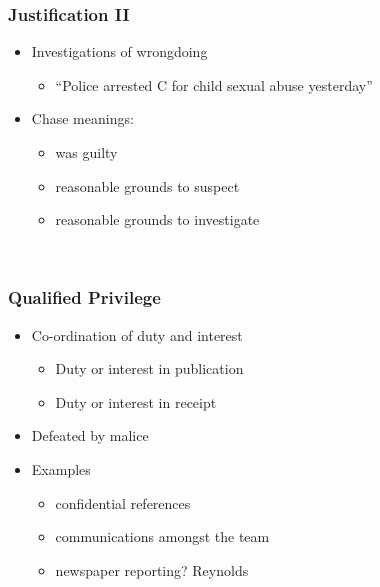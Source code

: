 \documentclass[ignorenonframetext,]{beamer}
\begin{document}
\begin{frame}
\frametitle{Justification II}

\begin{itemize}
\item  Investigations of wrongdoing

  \begin{itemize}
  \item    ``Police arrested C for child sexual abuse yesterday''
  \end{itemize}
\item  {Chase} meanings:

  \begin{itemize}
  \item    was guilty
  \item    reasonable grounds to suspect
  \item    reasonable grounds to investigate
  \end{itemize}
\end{itemize}

~


\end{frame}

\begin{frame}
\frametitle{Qualified Privilege}

\begin{itemize}
\item  Co-ordination of duty and interest

  \begin{itemize}
  \item    Duty or interest in publication
  \item    Duty or interest in receipt
  \end{itemize}
\item  Defeated by {malice}
\item  Examples

  \begin{itemize}
  \item    confidential references
  \item    communications amongst the team
  \item    newspaper reporting? {Reynolds}
  \end{itemize}
\end{itemize}

~


\end{frame}
\end{document}
